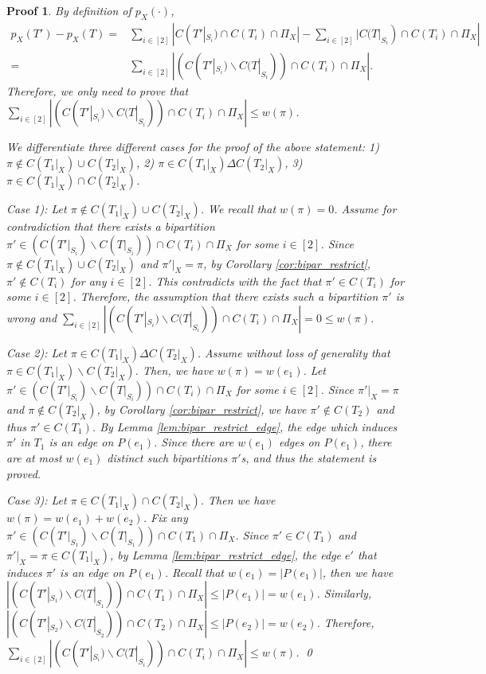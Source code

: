 \documentclass{bmcart}
\theoremstyle{mystyle}
\theoremstyle{proofstyle}
\newtheorem*{proof2}{Proof}
\newenvironment{proofnospace}{\begin{proof2}}{\qed \end{proof2}}
\begin{document}
\lemOneBiparUpperbound*
\begin{proofnospace}
    By definition of $p_X(\cdot)$, 
    \begin{align*}
         p_X(T') - p_X(T) 
        =& \sum_{i \in [2]} |C(T'|_{S_i}) \cap C(T_i) \cap \Pi_X| - \sum_{i \in [2]} |C(T|_{S_i}) \cap C(T_i) \cap \Pi_X| \\
        =& \sum_{i \in [2]}|(C(T'|_{S_i})\backslash C(T|_{S_i})) \cap C(T_i) \cap \Pi_X|.
    \end{align*}
    Therefore, we only need to prove that $\sum_{i \in [2]}|(C(T'|_{S_i})\backslash C(T|_{S_i})) \cap C(T_i) \cap \Pi_X| \le w(\pi)$. \smallskip
    
    We differentiate three different cases for the proof of the above statement: 1) $\pi \notin C(T_1|_X)\cup C(T_2|_X)$, 2) $\pi \in C(T_1|_X) \Delta C(T_2|_X)$, 3) $\pi \in C(T_1|_X) \cap C(T_2|_X)$. \smallskip
    
    Case 1): Let $\pi \notin C(T_1|_X)\cup C(T_2|_X)$. We recall that $w(\pi) = 0$. Assume for contradiction that there exists a bipartition $\pi'\in (C(T'|_{S_i})\backslash C(T|_{S_i})) \cap C(T_i) \cap \Pi_X$ for some $i \in [2]$.  Since $\pi \notin C(T_1|_X)\cup C(T_2|_X)$ and $\pi'|_X = \pi$, by Corollary \ref{cor:bipar_restrict}, $\pi' \notin C(T_i)$ for any $i \in [2]$. This contradicts with the fact that $\pi' \in C(T_i)$ for some $i \in [2]$. Therefore, the assumption that there exists such a bipartition $\pi'$ is wrong and $\sum_{i \in [2]}|(C(T'|_{S_i})\backslash C(T|_{S_i})) \cap C(T_i) \cap \Pi_X| = 0 \le w(\pi)$.\smallskip
    
    Case 2): Let $\pi \in C(T_1|_X) \Delta C(T_2|_X)$. Assume without loss of generality that $\pi \in C(T_1|_X) \backslash C(T_2|_X)$. Then, we have $w(\pi) = w(e_1)$. Let $\pi'\in (C(T'|_{S_i})\backslash C(T|_{S_i})) \cap C(T_i) \cap \Pi_X$ for some $i \in [2]$. Since $\pi'|_X = \pi$ and $\pi \notin C(T_2|_X)$, by Corollary \ref{cor:bipar_restrict}, we have $\pi' \notin C(T_2)$ and thus $\pi' \in C(T_1)$. By Lemma \ref{lem:bipar_restrict_edge}, the edge which induces $\pi'$ in $T_1$ is an edge on $P(e_1)$. Since there are $w(e_1)$ edges on $P(e_1)$, there are at most $w(e_1)$ distinct such bipartitions $\pi'$s, and thus the statement is proved.\smallskip
    
    Case 3): Let $\pi \in C(T_1|_X) \cap C(T_2|_X)$. Then we have $w(\pi) = w(e_1)+w(e_2)$. Fix any $\pi'\in (C(T'|_{S_1})\backslash C(T|_{S_1})) \cap C(T_1) \cap \Pi_X$. Since $\pi' \in C(T_1)$ and $\pi'|_X = \pi \in C(T_1|_X)$, by Lemma \ref{lem:bipar_restrict_edge}, the edge $e'$ that induces $\pi'$ is an edge on $P(e_1)$. Recall that $w(e_1) = |P(e_1)|$, then we have $|(C(T'|_{S_1})\backslash C(T|_{S_1})) \cap C(T_1) \cap \Pi_X| \le |P(e_1)| = w(e_1)$. Similarly, $|(C(T'|_{S_2})\backslash C(T|_{S_2})) \cap C(T_2) \cap \Pi_X| \le |P(e_2)| = w(e_2)$. Therefore, $\sum_{i \in [2]}|(C(T'|_{S_i})\backslash C(T|_{S_i})) \cap C(T_i) \cap \Pi_X| \le w(\pi)$.
\end{proofnospace}
\end{document}
